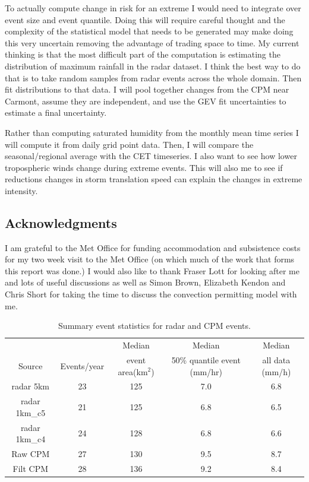 \documentclass[11pt,a4paper]{article}
\begin{document}
 
 To actually  compute change in risk for an extreme I would need to integrate over event size and event quantile. Doing this will require careful thought and the complexity of the statistical model  that needs to be generated may make doing this very uncertain removing the advantage of trading space to time.  My current thinking is that the most difficult part of the computation is estimating the distribution of maximum rainfall in the radar dataset. I think the best way to do that is to take random samples from radar events across the whole domain. Then fit distributions to that data.  I will pool together changes from the CPM near Carmont, assume they are independent, and use the GEV fit  uncertainties to estimate a final uncertainty. 

 
Rather than computing saturated humidity from the monthly mean time series I will compute it from daily grid point data. Then, I will compare the seasonal/regional average with the CET timeseries.  I also want to see how lower tropospheric  winds change during extreme events. This will also me to see if reductions changes in storm translation speed can explain the changes in extreme intensity. 

\printbibliography %

\subsection{Acknowledgments}
I am grateful to the Met Office for funding accommodation and subsistence costs for my two week visit to the Met Office (on which much of the work that forms this report was done.) I would also like to thank Fraser Lott for looking after me and lots of useful discussions as well as Simon Brown, Elizabeth Kendon and Chris Short for  taking the time to discuss the convection permitting model with me.

\begin{table}
	\begin{tabular}{ccccc}
		& & Median & Median & Median\\
		Source & Events/year & event area(km$^2$) & 50\% quantile event (mm/hr) & all data (mm/h)\\
		radar 5km & 23 & 125 & 7.0 & 6.8 \\
		radar 1km\_c5 & 21 & 125 & 6.8 & 6.5\\
		radar 1km\_c4 & 24 & 128 & 6.8 & 6.6\\ \hline
		Raw CPM & 27 & 130  & 9.5 & 8.7\\
		Filt CPM & 28 & 136 & 9.2 & 8.4\\
		
	\end{tabular}
	\label{tab:summary}
	\caption{Summary event statistics for radar and CPM events. }
\end{table}
\end{document}
